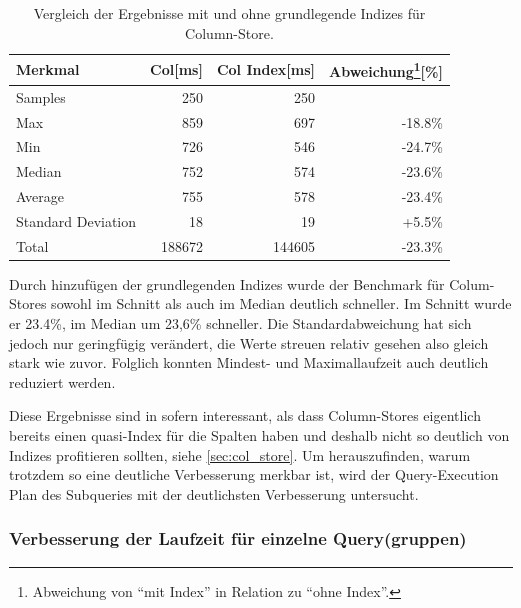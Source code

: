 \begin{table}[H]
\centering
    \begin{tabularx}{10cm}{lrrr}
        \toprule
        Merkmal             &   Col[ms]    &    Col Index[ms] & Abweichung\footnote{Abweichung von \enquote{mit Index} in Relation zu \enquote{ohne Index}.}[\%]\\
        \toprule
        Samples             &   250        &   250      &        \\
        \midrule    
        Max                 &   859        &   697      & -18.8\%\\
        Min                 &   726        &   546      & -24.7\%\\
        Median              &   752        &   574      & -23.6\%\\
        Average             &   755        &   578      & -23.4\%\\
        Standard Deviation  &   18         &   19       & +5.5\%\\
        Total               &   188672     &   144605   & -23.3\%\\
        \bottomrule
    \end{tabularx}
\caption{Vergleich der Ergebnisse mit und ohne grundlegende Indizes für Column-Store.}
\label{tab:basic_index_col}
\end{table}

Durch hinzufügen der grundlegenden Indizes wurde der Benchmark für Colum-Stores sowohl im Schnitt als auch im Median deutlich schneller.
Im Schnitt wurde er 23.4\%, im Median um 23,6\% schneller. Die Standardabweichung hat sich jedoch nur geringfügig verändert, die Werte streuen relativ gesehen also gleich stark wie zuvor. Folglich konnten Mindest- und Maximallaufzeit auch deutlich reduziert werden. 


Diese Ergebnisse sind in sofern interessant, als dass Column-Stores eigentlich bereits einen quasi-Index für die Spalten haben und deshalb nicht so deutlich von Indizes profitieren sollten, siehe \ref{sec:col_store}.
Um herauszufinden, warum trotzdem so eine deutliche Verbesserung merkbar ist, wird der Query-Execution Plan des Subqueries mit der deutlichsten Verbesserung untersucht.

\subsubsection{Verbesserung der Laufzeit für einzelne Query(gruppen)}

